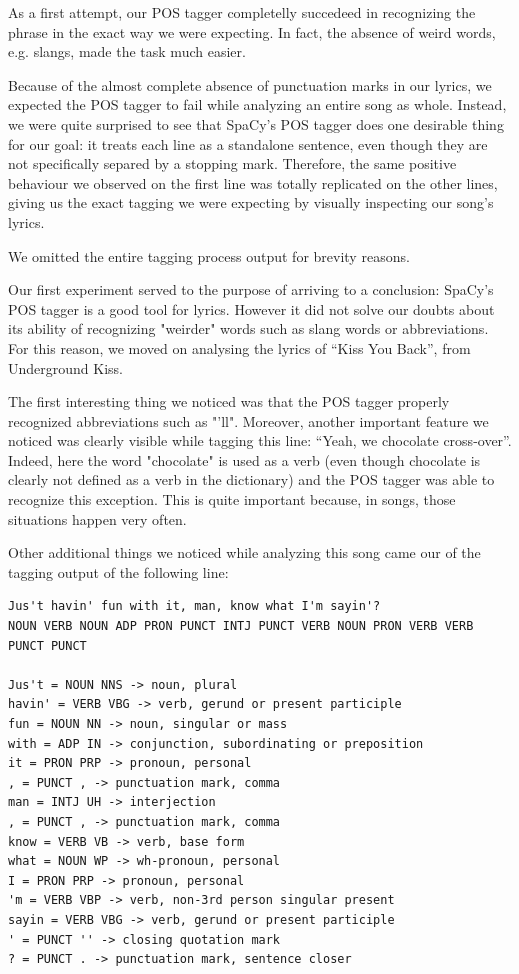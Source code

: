 As a first attempt, our POS tagger completelly succedeed in recognizing the phrase in the 
exact way we were expecting. In fact, the absence of weird words, e.g. slangs, made the
task much easier.

Because of the almost complete absence of punctuation marks in our lyrics, we expected
the POS tagger to fail while analyzing an entire song as whole. Instead, we were quite
surprised to see that SpaCy's POS tagger does one desirable thing for our goal:
it treats each line as a standalone sentence, even though they are not specifically separed by
a stopping mark. Therefore, the same positive behaviour we observed on the first line
was totally replicated on the other lines, giving us the exact tagging we were
expecting by visually inspecting our song's lyrics.

We omitted the entire tagging process output for brevity reasons.

Our first experiment served to the purpose of arriving to a conclusion: SpaCy's POS tagger
is a good tool for lyrics. However it did not solve our doubts about its ability of recognizing
"weirder" words such as slang words or abbreviations. For this reason, we moved on 
analysing the lyrics of ``Kiss You Back'', from Underground Kiss.

The first interesting thing we noticed was that the POS tagger properly recognized abbreviations such as "'ll".
Moreover, another important feature we noticed was clearly visible while tagging this line: ``Yeah, we chocolate cross-over''.
Indeed, here the word "chocolate" is used as a verb (even though chocolate is clearly not defined as a verb in 
the dictionary) and the POS tagger was able to recognize this exception. 
This is quite important because, in songs, those situations happen very often.

Other additional things we noticed while analyzing this song came our of the tagging output of the following line:

\begin{lstlisting}
Jus't havin' fun with it, man, know what I'm sayin'?
NOUN VERB NOUN ADP PRON PUNCT INTJ PUNCT VERB NOUN PRON VERB VERB PUNCT PUNCT 

Jus't = NOUN NNS -> noun, plural
havin' = VERB VBG -> verb, gerund or present participle
fun = NOUN NN -> noun, singular or mass
with = ADP IN -> conjunction, subordinating or preposition
it = PRON PRP -> pronoun, personal
, = PUNCT , -> punctuation mark, comma
man = INTJ UH -> interjection
, = PUNCT , -> punctuation mark, comma
know = VERB VB -> verb, base form
what = NOUN WP -> wh-pronoun, personal
I = PRON PRP -> pronoun, personal
'm = VERB VBP -> verb, non-3rd person singular present
sayin = VERB VBG -> verb, gerund or present participle
' = PUNCT '' -> closing quotation mark
? = PUNCT . -> punctuation mark, sentence closer
\end{lstlisting}

